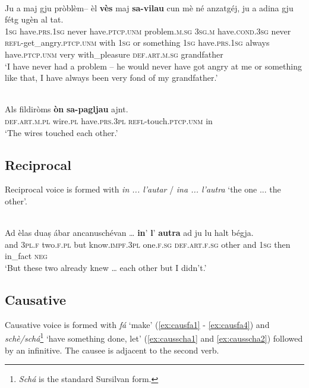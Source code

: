 \ea\label{ex:refvaj2}
\\
\gll Ju a maj gju pròblèm– èl \textbf{vès} maj \textbf{sa-vilau} cun mè né anzatgéj, ju a adina gju fétg ugèn al tat.   \\
\textsc{1sg} have.\textsc{prs.1sg} never have.\textsc{ptcp.unm} problem.\textsc{m.sg} \textsc{3sg.m} have.\textsc{cond.3sg} never \textsc{refl-}get\_angry.\textsc{ptcp.unm} with \textsc{1sg} or something \textsc{1sg} have.\textsc{prs.1sg} always have.\textsc{ptcp.unm} very with\_pleasure \textsc{def.art.m.sg} grandfather\\
\glt `I have never had a problem – he would never have got angry at me or something like that, I have always been very fond of my grandfather.'
\z

\ea\label{ex:refvaj3}
\\
\gll   Als fildiròms \textbf{òn} \textbf{sa-pagljau} ajnt.\\
    \textsc{def.art.m.pl} wire.\textsc{pl} have.\textsc{prs.3pl} \textsc{refl}-touch.\textsc{ptcp.unm} in \\
\glt `The wires touched each other.'
\z


\subsection{Reciprocal}
Reciprocal voice is formed with \textit{in ... l'autar} / \textit{ina ... l'autra} `the one ... the other'.



\ea\label{}
\\
\gll    Ad èlas duaṣ ábar ancanuschévan … \textbf{in}’ \textbf{l}’ \textbf{autra} ad ju lu halt bégja.\\
and \textsc{3pl.f} two.\textsc{f.pl} but know.\textsc{impf.3pl} {} one.\textsc{f.sg}  \textsc{def.art.f.sg} other and \textsc{1sg} then in\_fact \textsc{neg}\\
\glt `But these two already knew … each other but I didn’t.'
\z


\subsection{Causative}
Causative voice is formed with \textit{fá} ‘make’ (\ref{ex:causfa1} - \ref{ex:causfa4}) and \textit{schè/schá}\footnote{\textit{Schá} is the standard Sursilvan form.} `have something done, let' (\ref{ex:causscha1} and \ref{ex:causscha2}) followed by an infinitive. The causee is  adjacent to the second verb.

